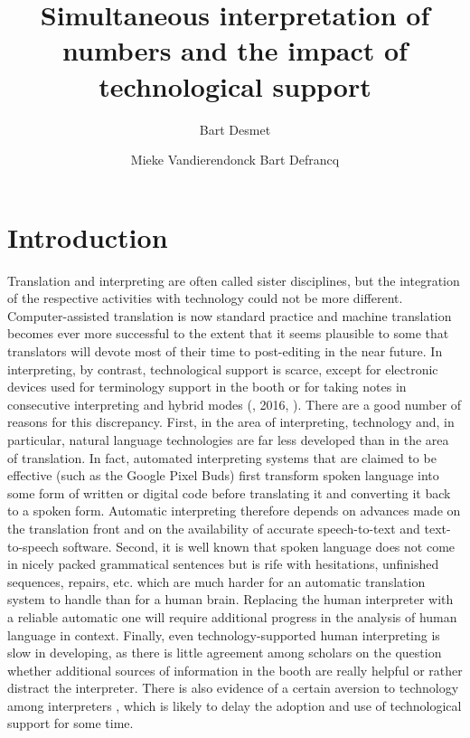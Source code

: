 \documentclass[output=paper]{langsci/langscibook}
\title{Simultaneous interpretation of numbers and the impact of technological support}
\author{%
 Bart Desmet\affiliation{University of Eden}\and%
 Mieke Vandierendonck\affiliation{University of Eden}\lastand%
 Bart Defrancq\affiliation{University of Eden}
}
\begin{document}

 

 
\section{Introduction}
Translation and interpreting are often called sister disciplines, but the integration of the respective activities with technology could not be more different. Computer-assisted translation is now standard practice and machine translation becomes ever more successful to the extent that it seems plausible to some that translators will devote most of their time to post-editing in the near future. In interpreting, by contrast, technological support is scarce, except for electronic devices used for terminology support in the booth \citep{Fantinuoli2012} or for taking notes in consecutive interpreting and hybrid modes (\citealt{Orlando2014}, 2016, \citealt{Goldsmith2017}). There are a good number of reasons for this discrepancy. First, in the area of interpreting, technology and, in particular, natural language technologies are far less developed than in the area of translation. In fact, automated interpreting systems that are claimed to be effective (such as the Google Pixel Buds) first transform spoken language into some form of written or digital code before translating it and converting it back to a spoken form. Automatic interpreting therefore depends on advances made on the translation front and on the availability of accurate speech-to-text and text-to-speech software. Second, it is well known that spoken language does not come in nicely packed grammatical sentences but is rife with hesitations, unfinished sequences, repairs, etc. which are much harder for an automatic translation system to handle than for a human brain. Replacing the human interpreter with a reliable automatic one will require additional progress in the analysis of human language in context. Finally, even technology-supported human interpreting is slow in developing, as there is little agreement among scholars on the question whether additional sources of information in the booth are really helpful or rather distract the interpreter. There is also evidence of a certain aversion to technology among interpreters \citep{CorpasPastor2016}, which is likely to delay the adoption and use of technological support for some time. 
\end{document}
